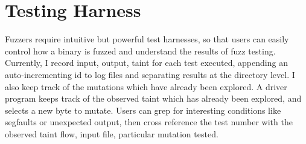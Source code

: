 \documentclass[11pt,expanded,copyright]{fsuthesis}
\begin{document}
	
	
\section{Testing Harness}

Fuzzers require intuitive but powerful test harnesses, so that users can easily control how a binary is fuzzed and understand the results of fuzz testing. Currently, I record input, output, taint for each test executed, appending an auto-incrementing id to log files and separating results at the directory level. I also keep track of the mutations which have already been explored. A driver program keeps track of the observed taint which has already been explored, and selects a new byte to mutate. Users can grep for interesting conditions like segfaults or unexpected output, then cross reference the test number with the observed taint flow, input file, particular mutation tested.




\end{document}
